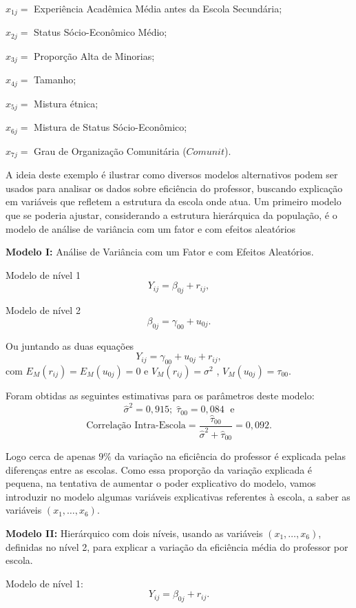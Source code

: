 \documentclass[]{book}
\theoremstyle{definition}
\theoremstyle{definition}
\theoremstyle{definition}
\theoremstyle{remark}
\begin{document}
\(x_{1j}=\) Experiência Acadêmica Média antes da Escola Secundária;

\(x_{2j}=\) Status Sócio-Econômico Médio;

\(x_{3j}=\) Proporção Alta de Minorias;

\(x_{4j}=\) Tamanho;

\(x_{5j}=\) Mistura étnica;

\(x_{6j}=\) Mistura de Status Sócio-Econômico;

\(x_{7j}=\) Grau de Organização Comunitária (\(Comunit\)).

A ideia deste exemplo é ilustrar como diversos modelos alternativos
podem ser usados para analisar os dados sobre eficiência do professor,
buscando explicação em variáveis que refletem a estrutura da escola onde
atua. Um primeiro modelo que se poderia ajustar, considerando a
estrutura hierárquica da população, é o modelo de análise de variância
com um fator e com efeitos aleatórios

\textbf{Modelo I: }Análise de Variância com um Fator e com Efeitos
Aleatórios.

Modelo de nível 1 \[
Y_{ij}=\beta _{0j}+r_{ij},
\]

Modelo de nível 2 \[
\beta _{0j}=\gamma _{00}+u_{0j}.
\]

Ou juntando as duas equações \[
Y_{ij}=\gamma _{00}+u_{0j}+r_{ij},
\] com \(E_{M}\left(r_{ij}\right) =E_{M}\left( u_{0j}\right) =0\) e
\(V_{M}\left(r_{ij}\right) =\sigma ^{2}\) ,
\(V_{M}\left( u_{0j}\right) =\tau _{00}\).

Foram obtidas as seguintes estimativas para os parâmetros deste modelo:
\[
\hat{\sigma}^{2}=0,915;\;\hat{\tau}_{00}=0,084\;\mbox{ e}
\] \[
\text{Correlação Intra-Escola}=\frac{\hat{\tau}_{00}}{\hat{
\sigma}^{2}+\hat{\tau}_{00}}=0,092.
\]

Logo cerca de apenas \(9\%\) da variação na eficiência do professor é
explicada pelas diferenças entre as escolas. Como essa proporção da
variação explicada é pequena, na tentativa de aumentar o poder
explicativo do modelo, vamos introduzir no modelo algumas variáveis
explicativas referentes à escola, a saber as variáveis
\(\left( x_{1},\ldots ,x_{6}\right)\).

\textbf{Modelo II:} Hierárquico com dois níveis, usando as variáveis
\(\left( x_{1},\ldots ,x_{6}\right)\), definidas no nível 2, para
explicar a variação da eficiência média do professor por escola.

Modelo de nível 1: \[
Y_{ij}=\beta _{0j}+r_{ij}.
\]
\end{document}
